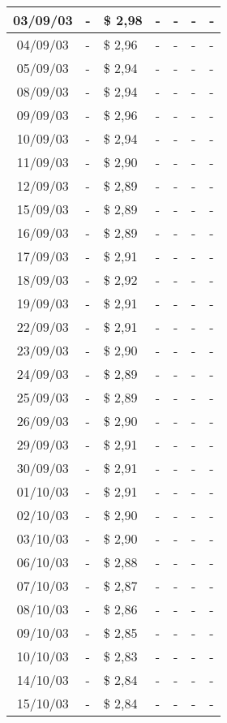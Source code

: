 \begin{center}
\begin{longtable}{|c|p{1.5cm}|p{1.5cm}|p{1.5cm}|p{1.5cm}|p{1.5cm}|p{1.5cm}|}
03/09/03 & - & \$ 2,98 & - & - & - & - \\ \hline
04/09/03 & - & \$ 2,96 & - & - & - & - \\ \hline
05/09/03 & - & \$ 2,94 & - & - & - & - \\ \hline
08/09/03 & - & \$ 2,94 & - & - & - & - \\ \hline
09/09/03 & - & \$ 2,96 & - & - & - & - \\ \hline
10/09/03 & - & \$ 2,94 & - & - & - & - \\ \hline
11/09/03 & - & \$ 2,90 & - & - & - & - \\ \hline
12/09/03 & - & \$ 2,89 & - & - & - & - \\ \hline
15/09/03 & - & \$ 2,89 & - & - & - & - \\ \hline
16/09/03 & - & \$ 2,89 & - & - & - & - \\ \hline
17/09/03 & - & \$ 2,91 & - & - & - & - \\ \hline
18/09/03 & - & \$ 2,92 & - & - & - & - \\ \hline
19/09/03 & - & \$ 2,91 & - & - & - & - \\ \hline
22/09/03 & - & \$ 2,91 & - & - & - & - \\ \hline
23/09/03 & - & \$ 2,90 & - & - & - & - \\ \hline
24/09/03 & - & \$ 2,89 & - & - & - & - \\ \hline
25/09/03 & - & \$ 2,89 & - & - & - & - \\ \hline
26/09/03 & - & \$ 2,90 & - & - & - & - \\ \hline
29/09/03 & - & \$ 2,91 & - & - & - & - \\ \hline
30/09/03 & - & \$ 2,91 & - & - & - & - \\ \hline
01/10/03 & - & \$ 2,91 & - & - & - & - \\ \hline
02/10/03 & - & \$ 2,90 & - & - & - & - \\ \hline
03/10/03 & - & \$ 2,90 & - & - & - & - \\ \hline
06/10/03 & - & \$ 2,88 & - & - & - & - \\ \hline
07/10/03 & - & \$ 2,87 & - & - & - & - \\ \hline
08/10/03 & - & \$ 2,86 & - & - & - & - \\ \hline
09/10/03 & - & \$ 2,85 & - & - & - & - \\ \hline
10/10/03 & - & \$ 2,83 & - & - & - & - \\ \hline
14/10/03 & - & \$ 2,84 & - & - & - & - \\ \hline
15/10/03 & - & \$ 2,84 & - & - & - & - \\ \hline

\end{longtable}
\end{center}
